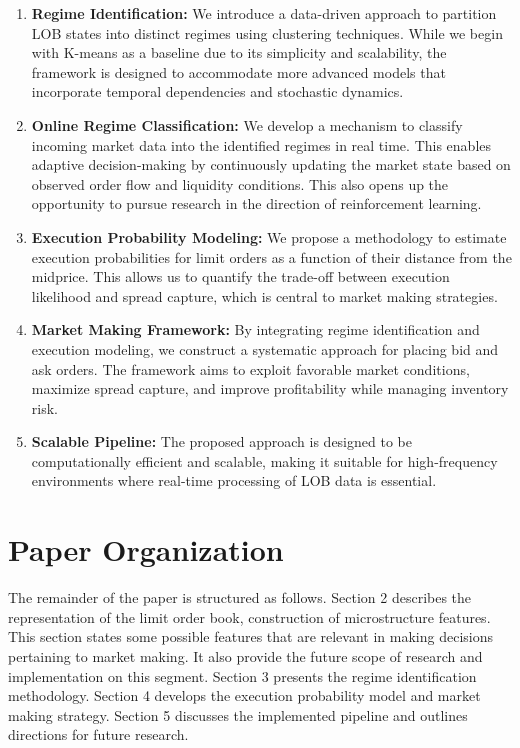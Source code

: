 \documentclass[12pt,a4paper]{report}
\begin{document}
\begin{enumerate}
    \item \textbf{Regime Identification:} We introduce a data-driven approach to partition LOB states into distinct regimes using clustering techniques. While we begin with K-means as a baseline due to its simplicity and scalability, the framework is designed to accommodate more advanced models that incorporate temporal dependencies and stochastic dynamics.

    \item \textbf{Online Regime Classification:} We develop a mechanism to classify incoming market data into the identified regimes in real time. This enables adaptive decision-making by continuously updating the market state based on observed order flow and liquidity conditions. This also opens up the opportunity to pursue research in the direction of reinforcement learning.

    \item \textbf{Execution Probability Modeling:} We propose a methodology to estimate execution probabilities for limit orders as a function of their distance from the midprice. This allows us to quantify the trade-off between execution likelihood and spread capture, which is central to market making strategies.

    \item \textbf{Market Making Framework:} By integrating regime identification and execution modeling, we construct a systematic approach for placing bid and ask orders. The framework aims to exploit favorable market conditions, maximize spread capture, and improve profitability while managing inventory risk.

    \item \textbf{Scalable Pipeline:} The proposed approach is designed to be computationally efficient and scalable, making it suitable for high-frequency environments where real-time processing of LOB data is essential.
\end{enumerate}

\section{Paper Organization}

The remainder of the paper is structured as follows. Section 2 describes the representation of the limit order book, construction of microstructure features. This section states some possible features that are relevant in making decisions pertaining to market making. It also provide the future scope of research and implementation on this segment.  Section 3 presents the regime identification methodology. Section 4 develops the execution probability model and market making strategy. Section 5 discusses the implemented pipeline and outlines directions for future research.
\end{document}
